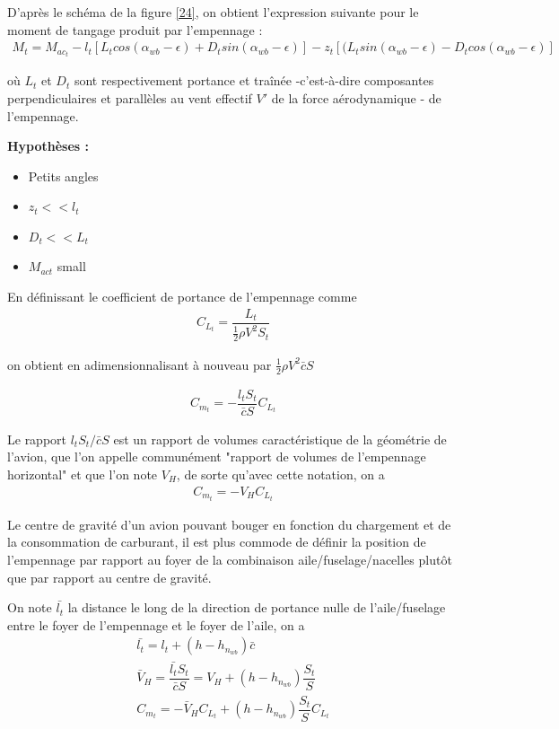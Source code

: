 \documentclass{report}
\begin{document}
D'après le schéma de la figure \ref{24}, on obtient l'expression suivante pour le moment de tangage produit par l'empennage :
\begin{eqnarray}
M_t=M_{ac_t}-l_t[L_tcos(\alpha_{wb}-\epsilon)+D_tsin(\alpha_{wb}-\epsilon)]-z_t[(L_tsin(\alpha_{wb}-\epsilon)-D_tcos(\alpha_{wb}-\epsilon)]
\end{eqnarray}

où $L_t$ et $D_t$ sont respectivement portance et traînée -c'est-à-dire composantes perpendiculaires et parallèles au vent effectif $V'$ de la force aérodynamique - de l'empennage. 

\textbf{Hypothèses :}
\begin{itemize}
    \item Petits angles
    \item $z_t<<l_t$
    \item $D_t<<L_t$
    \item $M_{act}$ small
\end{itemize}

En définissant le coefficient de portance de l'empennage comme
\begin{eqnarray}
C_{L_t}=\dfrac{L_t}{\frac{1}{2}\rho V^2 S_t}
\end{eqnarray}

on obtient en adimensionnalisant à nouveau par $\frac{1}{2}\rho V^2\bar{c}S$

\begin{eqnarray}
C_{m_t} = -\dfrac{l_tS_t}{\bar{c} S}C_{L_t}
\end{eqnarray}

Le rapport $l_tS_t/\bar{c}S$ est un rapport de volumes caractéristique de la géométrie de l'avion, que l'on appelle communément "rapport de volumes de l'empennage horizontal" et que l'on note $V_H$, de sorte qu'avec cette notation, on a
\begin{eqnarray}
C_{m_t}=-V_HC_{L_t}
\end{eqnarray}

Le centre de gravité d’un avion pouvant bouger en fonction du chargement et
de la consommation de carburant, il est plus commode de définir la position
de l’empennage par rapport au foyer de la combinaison aile/fuselage/nacelles
plutôt que par rapport au centre de gravité.

On note $\bar{l_t}$ la distance le long de la direction de portance nulle de l'aile/fuselage entre le foyer de l'empennage et le foyer de l'aile, on a
\begin{eqnarray}
\bar{l_t}=l_t+(h-h_{n_{wb}})\bar{c}\\
\bar{V}_H=\dfrac{\bar{l_t}S_t}{\bar{c}S}=V_H+(h-h_{n_{wb}})\dfrac{S_t}{S}\\
C_{m_t}=-\bar{V}_HC_{L_t}+(h-h_{n_{wb}})\dfrac{S_t}{S}C_{L_t}
\end{eqnarray}
\end{document}
